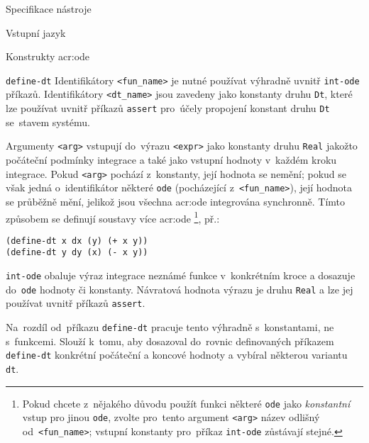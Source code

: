 \documentclass[thesis=M,czech]{FITthesis}[2012/06/26]
\newcommand{\acrlabel}[1]{acr:#1}
\newcommand{\acr}[1]{\acrshort{\acrlabel{#1}}}
\newcommand{\id}[1]{\texttt{#1}}
\newcommand{\hl}[1]{\textit{#1}}
\begin{document}
\begin{section}{Specifikace nástroje}
\begin{subsection}{Vstupní jazyk}
\begin{subsubsection}{Konstrukty \acr{ode}}
\begin{paragraph}{\id{define-dt}}
Identifikátory \id{<fun\_\-name>}
je nutné používat výhradně uvnitř \id{int-ode} příkazů.
Identifikátory \id{<dt\_\-name>} jsou zavedeny jako konstanty druhu \id{Dt},
které lze používat uvnitř příkazů \id{assert}
pro~účely propojení konstant druhu \id{Dt} se~stavem systému.

Argumenty \id{<arg>} vstupují do~výrazu \id{<expr>}
jako konstanty druhu \id{Real} jakožto počáteční podmínky integrace
a také jako vstupní hodnoty v~každém kroku integrace.
Pokud \id{<arg>} pochází z~konstanty, její hodnota se nemění;
pokud se však jedná o~identifikátor některé \id{ode}
(pocházející z~\id{<fun\_\-name>}),
její hodnota se průběžně mění,
jelikož jsou všechna \acr{ode} integrována synchronně.
Tímto způsobem se definují soustavy více \acr{ode}%
\footnote{Pokud chcete z~nějakého důvodu
použít funkci některé \id{ode}
jako \hl{konstantní} vstup pro jinou \id{ode},
zvolte pro~tento argument \id{<arg>}
název odlišný od~\id{<fun\_\-name>};
vstupní konstanty pro~příkaz \id{int-ode} zůstávají stejné.}, př.:
\begin{center}
\id{(define-dt x dx (y) (+ x y))}\\
\id{(define-dt y dy (x) (- x y))}
\end{center}
\end{paragraph} %


\begin{paragraph}{\id{int-ode}}\label{p:design:spec:ilang:ode:int}
obaluje výraz integrace neznámé funkce v~konkrétním kroce
a dosazuje do~\id{ode} hodnoty či konstanty.
Návratová hodnota výrazu je druhu \id{Real} a lze jej používat
uvnitř příkazů \id{assert}.

Na~rozdíl od~příkazu \id{define\--dt} pracuje tento
výhradně s~konstantami, ne s~funkcemi.
Slouží k~tomu, aby dosazoval do~rovnic definovaných
příkazem \id{define\--dt} konkrétní
počáteční a koncové hodnoty
a vybíral některou variantu \id{dt}.


\end{paragraph}
\end{subsubsection}
\end{subsection}
\end{section}
\end{document}
